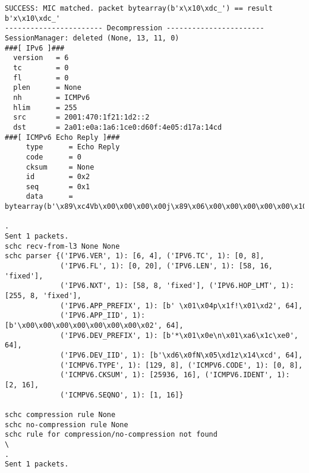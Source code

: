 \begin{lstlisting}[basicstyle=\ttfamily\tiny, numbers=none]
SUCCESS: MIC matched. packet bytearray(b'x\x10\xdc_') == result b'x\x10\xdc_'
----------------------- Decompression -----------------------
SessionManager: deleted (None, 13, 11, 0)
###[ IPv6 ]### 
  version   = 6
  tc        = 0
  fl        = 0
  plen      = None
  nh        = ICMPv6
  hlim      = 255
  src       = 2001:470:1f21:1d2::2
  dst       = 2a01:e0a:1a6:1ce0:d60f:4e05:d17a:14cd
###[ ICMPv6 Echo Reply ]### 
     type      = Echo Reply
     code      = 0
     cksum     = None
     id        = 0x2
     seq       = 0x1
     data      = bytearray(b'\x89\xc4Vb\x00\x00\x00\x00j\x89\x06\x00\x00\x00\x00\x00\x10\x11\x12\x13...')

.
Sent 1 packets.
schc recv-from-l3 None None
schc parser {('IPV6.VER', 1): [6, 4], ('IPV6.TC', 1): [0, 8], 
             ('IPV6.FL', 1): [0, 20], ('IPV6.LEN', 1): [58, 16, 'fixed'], 
             ('IPV6.NXT', 1): [58, 8, 'fixed'], ('IPV6.HOP_LMT', 1): [255, 8, 'fixed'],
             ('IPV6.APP_PREFIX', 1): [b' \x01\x04p\x1f!\x01\xd2', 64], 
             ('IPV6.APP_IID', 1): [b'\x00\x00\x00\x00\x00\x00\x00\x02', 64], 
             ('IPV6.DEV_PREFIX', 1): [b'*\x01\x0e\n\x01\xa6\x1c\xe0', 64], 
             ('IPV6.DEV_IID', 1): [b'\xd6\x0fN\x05\xd1z\x14\xcd', 64], 
             ('ICMPV6.TYPE', 1): [129, 8], ('ICMPV6.CODE', 1): [0, 8], 
             ('ICMPV6.CKSUM', 1): [25936, 16], ('ICMPV6.IDENT', 1): [2, 16], 
             ('ICMPV6.SEQNO', 1): [1, 16]} 
             
schc compression rule None
schc no-compression rule None
schc rule for compression/no-compression not found
\
.
Sent 1 packets.
\end{lstlisting}